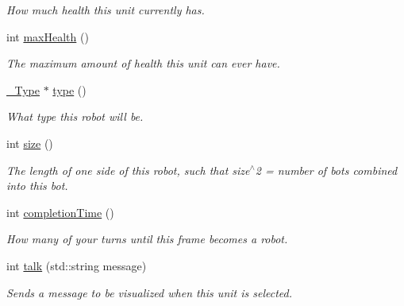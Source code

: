 \begin{DoxyCompactItemize}
\begin{DoxyCompactList}\small\item\em How much health this unit currently has. \item\end{DoxyCompactList}\item 
\hypertarget{classFrame_a289d21264e331e9f1659081ae2e3dc99}{
int \hyperlink{classFrame_a289d21264e331e9f1659081ae2e3dc99}{maxHealth} ()}
\label{classFrame_a289d21264e331e9f1659081ae2e3dc99}

\begin{DoxyCompactList}\small\item\em The maximum amount of health this unit can ever have. \item\end{DoxyCompactList}\item 
\hypertarget{classFrame_ad6cb00942444e8af07398c6b9e2dd6ab}{
\hyperlink{struct__Type}{\_\-Type} $\ast$ \hyperlink{classFrame_ad6cb00942444e8af07398c6b9e2dd6ab}{type} ()}
\label{classFrame_ad6cb00942444e8af07398c6b9e2dd6ab}

\begin{DoxyCompactList}\small\item\em What type this robot will be. \item\end{DoxyCompactList}\item 
\hypertarget{classFrame_a75d57082f9ac6da59af47f80167aba16}{
int \hyperlink{classFrame_a75d57082f9ac6da59af47f80167aba16}{size} ()}
\label{classFrame_a75d57082f9ac6da59af47f80167aba16}

\begin{DoxyCompactList}\small\item\em The length of one side of this robot, such that size$^\wedge$2 = number of bots combined into this bot. \item\end{DoxyCompactList}\item 
\hypertarget{classFrame_aaaf493c7edf8a7b4a65a6dadc61093c5}{
int \hyperlink{classFrame_aaaf493c7edf8a7b4a65a6dadc61093c5}{completionTime} ()}
\label{classFrame_aaaf493c7edf8a7b4a65a6dadc61093c5}

\begin{DoxyCompactList}\small\item\em How many of your turns until this frame becomes a robot. \item\end{DoxyCompactList}\item 
\hypertarget{classFrame_ac1465ce1473dab465d32971b9196978f}{
int \hyperlink{classFrame_ac1465ce1473dab465d32971b9196978f}{talk} (std::string message)}
\label{classFrame_ac1465ce1473dab465d32971b9196978f}

\begin{DoxyCompactList}\small\item\em Sends a message to be visualized when this unit is selected. \item\end{DoxyCompactList}\end{DoxyCompactItemize}
